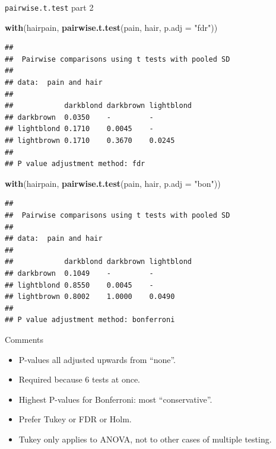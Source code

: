 \documentclass[
  ignorenonframetext,
]{beamer}
\newenvironment{Shaded}{\begin{snugshade}}{\end{snugshade}}
\newcommand{\DataTypeTok}[1]{\textcolor[rgb]{0.13,0.29,0.53}{#1}}
\newcommand{\KeywordTok}[1]{\textcolor[rgb]{0.13,0.29,0.53}{\textbf{#1}}}
\newcommand{\NormalTok}[1]{#1}
\newcommand{\StringTok}[1]{\textcolor[rgb]{0.31,0.60,0.02}{#1}}
\begin{document}
\begin{frame}[fragile]{\texttt{pairwise.t.test} part 2}
\protect\hypertarget{pairwise.t.test-part-2}{}

\tiny

\begin{Shaded}
\begin{Highlighting}[]
\KeywordTok{with}\NormalTok{(hairpain, }\KeywordTok{pairwise.t.test}\NormalTok{(pain, hair, }\DataTypeTok{p.adj =} \StringTok{"fdr"}\NormalTok{))}
\end{Highlighting}
\end{Shaded}

\begin{verbatim}
## 
##  Pairwise comparisons using t tests with pooled SD 
## 
## data:  pain and hair 
## 
##            darkblond darkbrown lightblond
## darkbrown  0.0350    -         -         
## lightblond 0.1710    0.0045    -         
## lightbrown 0.1710    0.3670    0.0245    
## 
## P value adjustment method: fdr
\end{verbatim}

\begin{Shaded}
\begin{Highlighting}[]
\KeywordTok{with}\NormalTok{(hairpain, }\KeywordTok{pairwise.t.test}\NormalTok{(pain, hair, }\DataTypeTok{p.adj =} \StringTok{"bon"}\NormalTok{))}
\end{Highlighting}
\end{Shaded}

\begin{verbatim}
## 
##  Pairwise comparisons using t tests with pooled SD 
## 
## data:  pain and hair 
## 
##            darkblond darkbrown lightblond
## darkbrown  0.1049    -         -         
## lightblond 0.8550    0.0045    -         
## lightbrown 0.8002    1.0000    0.0490    
## 
## P value adjustment method: bonferroni
\end{verbatim}

\normalsize

\end{frame}

\begin{frame}{Comments}
\protect\hypertarget{comments-16}{}

\begin{itemize}
\item
  P-values all adjusted upwards from ``none''.
\item
  Required because 6 tests at once.
\item
  Highest P-values for Bonferroni: most ``conservative''.
\item
  Prefer Tukey or FDR or Holm.
\item
  Tukey only applies to ANOVA, not to other cases of multiple testing.
\end{itemize}

\end{frame}
\end{document}
